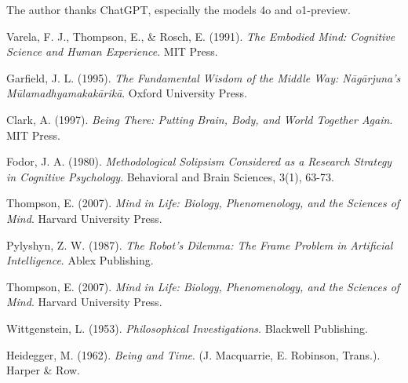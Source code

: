 \documentclass{article}
\begin{document}
The author thanks ChatGPT, especially the models 4o and o1-preview.

\begin{thebibliography}{9}

Varela, F. J., Thompson, E., \& Rosch, E. (1991). \textit{The Embodied Mind: Cognitive Science and Human Experience}. MIT Press.

Garfield, J. L. (1995). \textit{The Fundamental Wisdom of the Middle Way: Nāgārjuna's Mūlamadhyamakakārikā}. Oxford University Press.

 Clark, A. (1997). \textit{Being There: Putting Brain, Body, and World Together Again}. MIT Press.

 Fodor, J. A. (1980). \textit{Methodological Solipsism Considered as a Research Strategy in Cognitive Psychology}. Behavioral and Brain Sciences, 3(1), 63-73.

 Thompson, E. (2007). \textit{Mind in Life: Biology, Phenomenology, and the Sciences of Mind}. Harvard University Press.

 Pylyshyn, Z. W. (1987). \textit{The Robot's Dilemma: The Frame Problem in Artificial Intelligence}. Ablex Publishing.

 Thompson, E. (2007). \textit{Mind in Life: Biology, Phenomenology, and the Sciences of Mind}. Harvard University Press.

 Wittgenstein, L. (1953). \textit{Philosophical Investigations}. Blackwell Publishing.

 Heidegger, M. (1962). \textit{Being and Time}. (J. Macquarrie, E. Robinson, Trans.). Harper \& Row.

\end{thebibliography}
\end{document}
